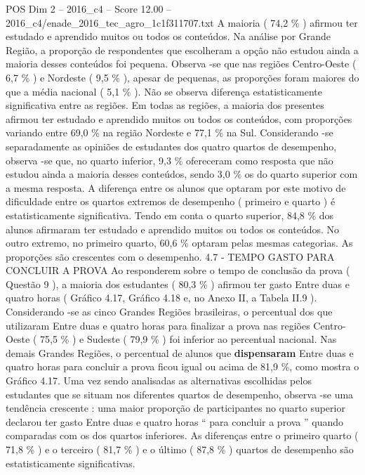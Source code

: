 \begin{textsample}{POS Dim 2 – 2016\_c4 – Score 12.00 – 2016\_c4/enade\_2016\_tec\_agro\_1c1f311707.txt}
A maioria ( 74,2 \% ) afirmou ter estudado e aprendido muitos ou todos os conteúdos.
Na análise por Grande Região, a proporção de respondentes que escolheram a opção não estudou ainda a maioria desses conteúdos foi pequena.
Observa -se que nas regiões Centro-Oeste ( 6,7 \% ) e Nordeste ( 9,5 \% ), apesar de pequenas, as proporções foram maiores do que a média nacional ( 5,1 \% ).
Não se observa diferença estatisticamente significativa entre as regiões.
Em todas as regiões, a maioria dos presentes afirmou ter estudado e aprendido muitos ou todos os conteúdos, com proporções variando entre 69,0 \% na região Nordeste e 77,1 \% na Sul.
Considerando -se separadamente as opiniões de estudantes dos quatro quartos de desempenho, observa -se que, no quarto inferior, 9,3 \% ofereceram como resposta que não estudou ainda a maioria desses conteúdos, sendo 3,0 \% os do quarto superior com a mesma resposta.
A diferença entre os alunos que optaram por este motivo de dificuldade entre os quartos extremos de desempenho ( primeiro e quarto ) é estatisticamente significativa.
Tendo em conta o quarto superior, 84,8 \% dos alunos afirmaram ter estudado e aprendido muitos ou todos os conteúdos.
No outro extremo, no primeiro quarto, 60,6 \% optaram pelas mesmas categorias.
As proporções são crescentes com o desempenho. 4.7 - TEMPO GASTO PARA CONCLUIR A PROVA Ao responderem sobre o tempo de conclusão da prova ( Questão 9 ), a maioria dos estudantes ( 80,3 \% ) afirmou ter gasto Entre duas e quatro horas ( Gráfico 4.17, Gráfico 4.18 e, no Anexo II, a Tabela II.9 ).
Considerando -se as cinco Grandes Regiões brasileiras, o percentual dos que utilizaram Entre duas e quatro horas para finalizar a prova nas regiões Centro-Oeste ( 75,5 \% ) e Sudeste ( 79,9 \% ) foi inferior ao percentual nacional.
Nas demais Grandes Regiões, o percentual de alunos que \textbf{dispensaram} Entre duas e quatro horas para concluir a prova ficou igual ou acima de 81,9 \%, como mostra o Gráfico 4.17.
Uma vez sendo analisadas as alternativas escolhidas pelos estudantes que se situam nos diferentes quartos de desempenho, observa -se uma tendência crescente : uma maior proporção de participantes no quarto superior declarou ter gasto Entre duas e quatro horas “ para concluir a prova ” quando comparadas com os dos quartos inferiores.
As diferenças entre o primeiro quarto ( 71,8 \% ) e o terceiro ( 81,7 \% ) e o último ( 87,8 \% ) quartos de desempenho são estatisticamente significativas.

\end{textsample}
